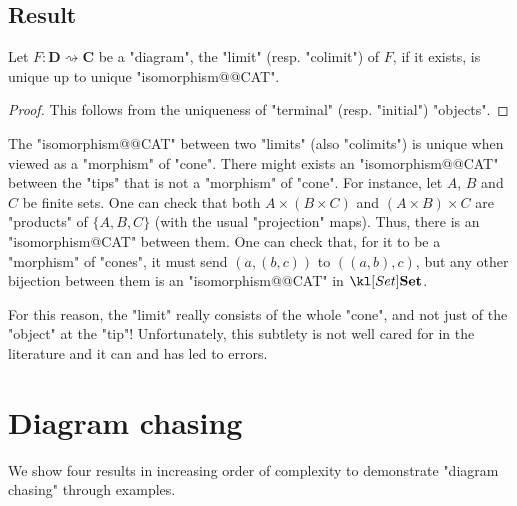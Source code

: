 \documentclass[main.tex]{subfiles}
\begin{document}
\subsection{Result}
\begin{prop}[Uniqueness]
    Let $F: \mathbf{D} \rightsquigarrow \mathbf{C}$ be a "diagram", the "limit" (resp. "colimit") of $F$, if it exists, is unique up to unique "isomorphism@@CAT".
\end{prop}
\begin{proof}
    This follows from the uniqueness of "terminal" (resp. "initial") "objects".
\end{proof}
\begin{rem}\label{rem:uniqueiso}
    The "isomorphism@@CAT" between two "limits" (also "colimits") is unique when viewed as a "morphism" of "cone". There might exists an "isomorphism@@CAT" between the "tips" that is not a "morphism" of "cone". For instance, let $A$, $B$ and $C$ be finite sets. One can check that both $A \times (B \times C)$ and $(A\times B) \times C$ are "products" of $\{A, B, C\}$ (with the usual "projection" maps). Thus, there is an "isomorphism@CAT" between them. One can check that, for it to be a "morphism" of "cones", it must send $(a, (b,c))$ to $((a,b), c)$, but any other bijection between them is an "isomorphism@@CAT" in $\catSet$.
    
    For this reason, the "limit" really consists of the whole "cone", and not just of the "object" at the "tip"! Unfortunately, this subtlety is not well cared for in the literature and it can and has led to errors.
\end{rem}

\section{Diagram chasing}
We show four results in increasing order of complexity to demonstrate "diagram chasing" through examples.
\end{document}
